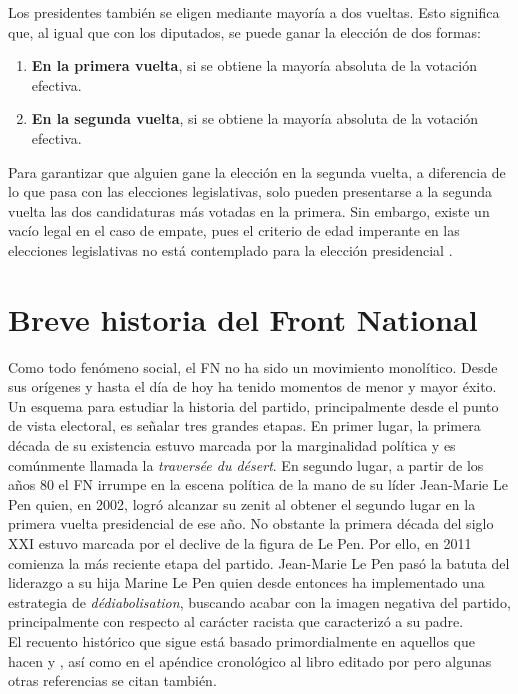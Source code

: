 Los presidentes también se eligen mediante mayoría a dos vueltas. Esto significa que, al igual que con los diputados, se puede ganar la elección de dos formas: 

\begin{enumerate}
\item \textbf{En la primera vuelta}, si se obtiene la mayoría absoluta de la votación efectiva.  
\item \textbf{En la segunda vuelta}, si se obtiene la mayoría absoluta de la votación efectiva. 
\end{enumerate}

Para garantizar que alguien gane la elección en la segunda vuelta, a diferencia de lo que pasa con las elecciones legislativas, solo pueden presentarse a la segunda vuelta las dos candidaturas más votadas en la primera. Sin embargo, existe un vacío legal en el caso de empate, pues el criterio de edad imperante en las elecciones legislativas no está contemplado para la elección presidencial \parencite{Parisien16}.\\

\section{Breve historia del Front National}

Como todo fenómeno social, el FN no ha sido un movimiento monolítico. Desde sus orígenes y hasta el día de hoy ha tenido momentos de menor y mayor éxito. Un esquema para estudiar la historia del partido, principalmente desde el punto de vista electoral, es señalar tres grandes etapas. En primer lugar, la primera década de su existencia estuvo marcada por la marginalidad política y es comúnmente llamada la \textit{traversée du désert}. En segundo lugar, a partir de los años 80 el FN irrumpe en la escena política de la mano de su líder Jean-Marie Le Pen quien, en 2002, logró alcanzar su zenit al obtener el segundo lugar en la primera vuelta presidencial de ese año. No obstante la primera década del siglo XXI estuvo marcada por el declive de la figura de Le Pen. Por ello, en 2011 comienza la más reciente etapa del partido. Jean-Marie Le Pen pasó la batuta del liderazgo a su hija Marine Le Pen quien desde entonces ha implementado una estrategia de \textit{dédiabolisation}, buscando acabar con la imagen negativa del partido, principalmente con respecto al carácter racista que caracterizó a su padre.\\ 

El recuento histórico que sigue está basado primordialmente en aquellos que hacen \textcite{Hainsworth16b} y \textcite{Stockemer17}, así como en el apéndice cronológico al libro editado por \textcite{CreponEtAl15} pero algunas otras referencias se citan también.\\


